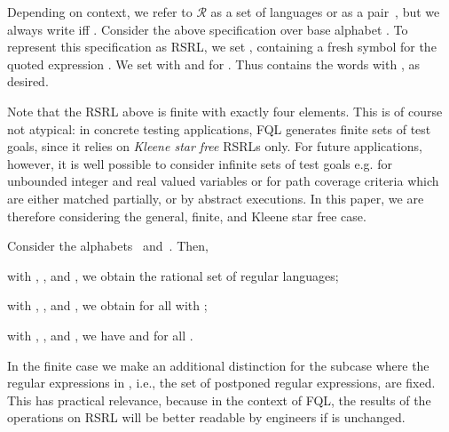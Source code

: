 \documentclass[envcountsame]{llncs}
\newcommand{\rationalset}{\ensuremath{\mathcal{R}}\xspace}
\newcommand{\RegularlyGeneratedLanguageSet}{rational set of regular languages\xspace}
\newcommand{\RegularlyGeneratedLanguageSetAbbrev}{RSRL\xspace}
\newcommand{\RegularlyGeneratedLanguageSetsAbbrev}{RSRLs\xspace}
\newcommand{\FQL}{FQL\xspace}
\begin{document}
Depending on context, we refer to \rationalset as a set of languages
or as a pair~, but we always write  iff
.
\label{ex:intro}
  Consider the above specification  over base alphabet .
To represent this specification as
  \RegularlyGeneratedLanguageSetAbbrev , we
  set , containing a fresh
  symbol  for the quoted expression
  .
We set  with
   and
   for .
Thus  contains the words  with , as desired.






Note that the \RegularlyGeneratedLanguageSetAbbrev above is finite
with exactly four elements.
This is of course not atypical: in concrete testing applications, \FQL
generates finite sets of test goals, since it relies on \emph{Kleene
  star free} \RegularlyGeneratedLanguageSetsAbbrev only.
For future applications, however, it is well possible to consider
infinite sets of test goals e.g. for unbounded integer and real valued
variables or for path coverage criteria which are either matched
partially, or by abstract executions.
In this paper, we are therefore considering the general, finite, and
Kleene star free case.


\begin{example}
  Consider the alphabets~
  and~. Then,
\begin{inparaenum}[\bfseries(1)]
  \item  with ,
    , and , we obtain the
    \RegularlyGeneratedLanguageSet ;
  \item with ,
    , and , we obtain  for
    all  with ;
  \item with ,
    , and , we have  and  for all .
  \end{inparaenum}
\end{example}



In the finite case we make an additional distinction for the
subcase where the regular expressions in , i.e., the set of
postponed regular expressions, are fixed. This has practical
relevance, because in the context of \FQL, the results of the
operations on \RegularlyGeneratedLanguageSetAbbrev will be better
readable by engineers if  is unchanged.
\end{document}
